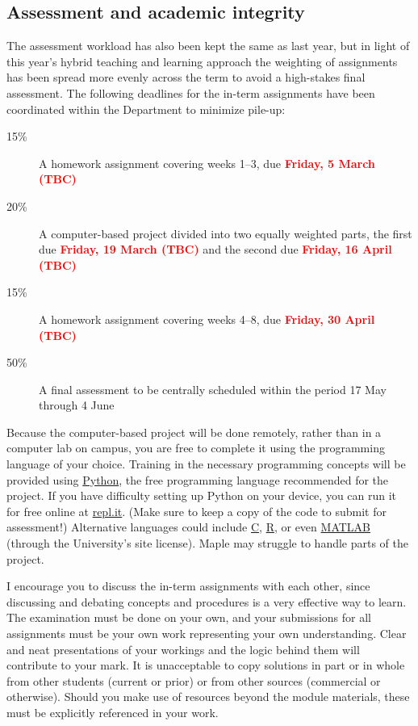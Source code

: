\documentclass[12 pt]{article} %
\newcommand{\TODO}[1]{\textcolor{red}{\textbf{#1}}}
\begin{document}
\subsection*{Assessment and academic integrity}
The assessment workload has also been kept the same as last year, but in light of this year's hybrid teaching and learning approach the weighting of assignments has been spread more evenly across the term to avoid a high-stakes final assessment.
The following deadlines for the in-term assignments have been coordinated within the Department to minimize pile-up: \\[-24 pt]
\begin{description}
  \item[15\%] A homework assignment covering weeks 1--3, due \TODO{Friday, 5 March (TBC)}
  \item[20\%] A computer-based project divided into two equally weighted parts, the first due \TODO{Friday, 19 March (TBC)} and the second due \TODO{Friday, 16 April (TBC)}
  \item[15\%] A homework assignment covering weeks 4--8, due \TODO{Friday, 30 April (TBC)}
  \item[50\%] A final assessment to be centrally scheduled within the period 17 May through 4 June
\end{description}

Because the computer-based project will be done remotely, rather than in a computer lab on campus, you are free to complete it using the programming language of your choice.
Training in the necessary programming concepts will be provided using \href{https://www.python.org}{Python}, the free programming language recommended for the project.
If you have difficulty setting up Python on your device, you can run it for free online at \href{https://repl.it/languages/python3}{repl.it}.
(Make sure to keep a copy of the code to submit for assessment!)
Alternative languages could include \href{https://en.wikipedia.org/wiki/C_(programming_language)}{C}, \href{https://www.r-project.org}{R}, or even \href{https://matlab.mathworks.com}{MATLAB} (through the University's site license).
Maple may struggle to handle parts of the project.

I encourage you to discuss the in-term assignments with each other, since discussing and debating concepts and procedures is a very effective way to learn.
The examination must be done on your own, and your submissions for all assignments must be your own work representing your own understanding.
Clear and neat presentations of your workings and the logic behind them will contribute to your mark.
It is unacceptable to copy solutions in part or in whole from other students (current or prior) or from other sources (commercial or otherwise).
Should you make use of resources beyond the module materials, these must be explicitly referenced in your work.
\end{document}
